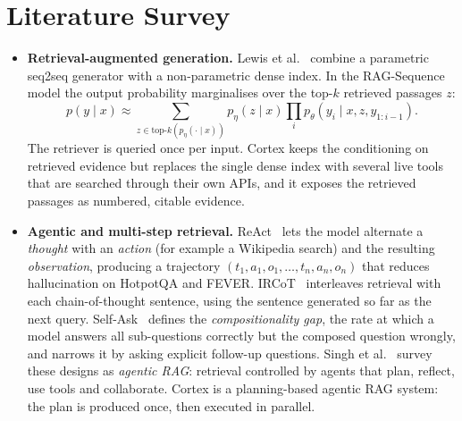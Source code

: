 \section{Literature Survey}
\begin{itemize}
\item \textbf{Retrieval-augmented generation.} Lewis et al.~\cite{lewis2020rag} combine a parametric seq2seq generator with a non-parametric dense index. In the RAG-Sequence model the output probability marginalises over the top-$k$ retrieved passages $z$:
\[ p(y \mid x) \approx \sum_{z \in \mathrm{top}\mbox{-}k(p_\eta(\cdot \mid x))} p_\eta(z \mid x) \prod_{i} p_\theta(y_i \mid x, z, y_{1:i-1}). \]
The retriever is queried once per input. Cortex keeps the conditioning on retrieved evidence but replaces the single dense index with several live tools that are searched through their own APIs, and it exposes the retrieved passages as numbered, citable evidence.

\item \textbf{Agentic and multi-step retrieval.} ReAct~\cite{yao2023react} lets the model alternate a \emph{thought} with an \emph{action} (for example a Wikipedia search) and the resulting \emph{observation}, producing a trajectory $(t_1, a_1, o_1, \ldots, t_n, a_n, o_n)$ that reduces hallucination on HotpotQA and FEVER. IRCoT~\cite{trivedi2023ircot} interleaves retrieval with each chain-of-thought sentence, using the sentence generated so far as the next query. Self-Ask~\cite{press2023selfask} defines the \emph{compositionality gap}, the rate at which a model answers all sub-questions correctly but the composed question wrongly, and narrows it by asking explicit follow-up questions. Singh et al.~\cite{singh2025agenticrag} survey these designs as \emph{agentic RAG}: retrieval controlled by agents that plan, reflect, use tools and collaborate. Cortex is a planning-based agentic RAG system: the plan is produced once, then executed in parallel.


\end{itemize}
